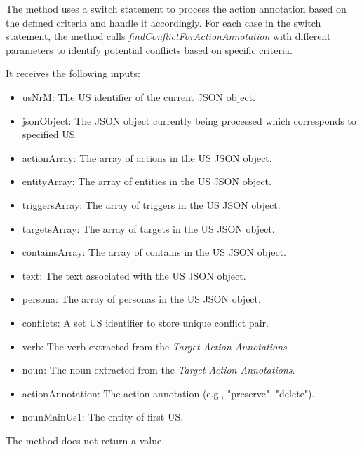 \begin{itemize}
	The method uses a switch statement to process the action annotation based on the defined criteria and handle it accordingly. For each case in the switch statement, the method calls \textit{findConflictForActionAnnotation} with different parameters to identify potential conflicts based on specific criteria.
	
	It receives the following inputs:
	\begin{itemize}
		\item usNrM: The US identifier of the current JSON object.
		
		\item jsonObject: The JSON object currently being processed which corresponds to specified US.
		
		\item actionArray: The array of actions in the US JSON object.
		
		\item entityArray: The array of entities in the US JSON object.
		
		\item triggersArray: The array of triggers in the US JSON object.
		
		\item targetsArray: The array of targets in the US JSON object.
		
		\item containsArray: The array of contains in the US JSON object.
		
		\item text: The text associated with the US JSON object.
		
		\item persona: The array of personas in the US JSON object.
		
		\item conflicts: A set US identifier to store unique conflict pair.
		
		\item verb: The verb extracted from the \textit{Target Action Annotations}.
		
		\item noun: The noun extracted from the \textit{Target Action Annotations}.
		
		\item actionAnnotation: The action annotation (e.g., "preserve", "delete").
		
		\item nounMainUs1: The entity of first US.
	\end{itemize}
	The method does not return a value.
	

\end{itemize}
